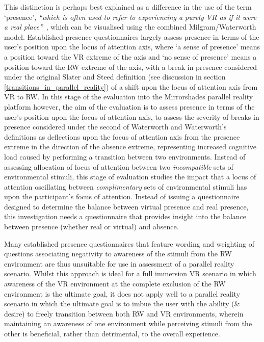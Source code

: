 This distinction is perhaps best explained as a difference in the use of the term `presence', \textit{``which is often used to refer to experiencing a purely VR as if it were a real place''}~\cite{Steed2014}, which can be visualised using the combined Milgram/Waterworth model. Established presence questionnaires largely assess presence in terms of the user's position upon the locus of attention axis, where `a sense of presence' means a position toward the VR extreme of the axis and `no sense of presence' means a position toward the RW extreme of the axis, with a break in presence considered under the original Slater and Steed definition (see discussion in section \ref{transitions_in_parallel_reality}) of a shift upon the locus of attention axis from VR to RW. In this stage of the evaluation into the Mirrorshades parallel reality platform however, the aim of the evaluation is to assess presence in terms of the user's position upon the focus of attention axis, to assess the severity of breaks in presence considered under the second of Waterworth and Waterworth's definitions as deflections upon the focus of attention axis from the presence extreme in the direction of the absence extreme, representing increased cognitive load caused by performing a transition between two environments. Instead of assessing allocation of locus of attention between two \textit{incompatible} sets of environmental stimuli, this stage of evaluation studies the impact that a locus of attention oscillating between \textit{complimentary} sets of environmental stimuli has upon the participant's focus of attention. Instead of issuing a questionnaire designed to determine the balance between virtual presence and real presence, this investigation needs a questionnaire that provides insight into the balance between presence (whether real or virtual) and absence.

Many established presence questionnaires that feature wording and weighting of questions associating negativity to awareness of the stimuli from the RW environment are thus unsuitable for use in assessment of a parallel reality scenario. Whilst this approach is ideal for a full immersion VR scenario in which awareness of the VR environment at the complete exclusion of the RW environment is the ultimate goal, it does not apply well to a parallel reality scenario in which the ultimate goal is to imbue the user with the ability (\& desire) to freely transition between both RW and VR environments, wherein maintaining an awareness of one environment while perceiving stimuli from the other is beneficial, rather than detrimental, to the overall experience.

